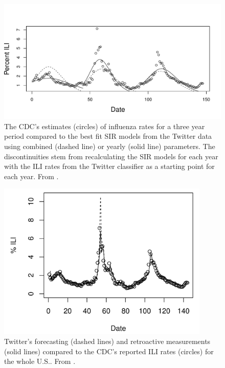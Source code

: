 \documentclass[11pt, a4paper,twoside]{report}\usepackage[]{graphicx}\usepackage[]{color}
\begin{document}
\begin{figure}[htbp!]
  \centering
    \includegraphics[width=1\textwidth]{02_todd_bodnar_SIR.pdf}
  \caption{The CDC's estimates (circles) of influenza rates for a three year period compared to the best fit SIR models from the Twitter data using combined (dashed line) or yearly (solid line) parameters. The discontinuities stem from recalculating the SIR models for each year with the ILI rates from the Twitter classifier as a starting point for each year. From \cite{bodnar_data_2015}.}
  \label{fig:cdc_fit_bodnar_thesis_SIR}
  \end{figure}

\begin{figure}[htbp!]
  \centering
    \includegraphics[width=0.9\textwidth]{03_cdc_fit_bodnar_thesis.png}
  \caption{Twitter's forecasting (dashed lines) and retroactive measurements (solid lines) compared to the CDC's reported ILI rates (circles) for the whole U.S.. From \cite{bodnar_data_2015}.}
  \label{fig:cdc_fit_bodnar_thesis}
  \end{figure}
  
\end{document}
